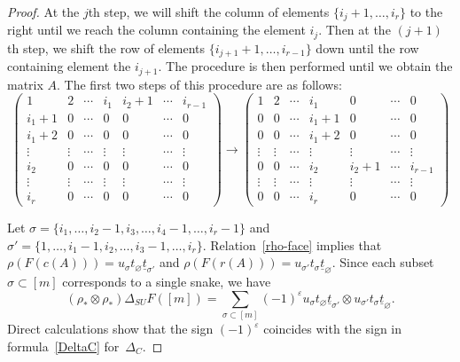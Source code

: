 \documentclass[a4paper,12pt]{amsart}
\theoremstyle{definition}
\theoremstyle{remark}
\numberwithin{equation}{section}
\begin{document}
\begin{proof}
At the $j$th step, we will shift the column of elements $\{i_j + 1, \ldots, i_r \}$ to the right until we reach the column containing the element $i_j$. Then at the $(j+1)$th step, we shift the row of elements $\{i_{j+1} + 1, \ldots, i_{r-1} \}$ down until the row containing element the $i_{j+1}$. The procedure is then performed until we obtain the matrix $A$. The first two steps of this procedure are as follows:
$$\begin{pmatrix}
1 & 2 & \cdots & i_1 & i_2 + 1 & \cdots & i_{r-1} \\
i_1 + 1 & 0 & \cdots & 0 & 0 & \cdots & 0 \\
i_1 + 2 & 0 & \cdots & 0 & 0 & \cdots & 0 \\
\vdots & \vdots & \cdots & \vdots & \vdots & \cdots & \vdots\\
i_2 & 0 & \cdots & 0 & 0 & \cdots & 0 \\
\vdots & \vdots & \cdots & \vdots & \vdots & \cdots & \vdots \\
i_{r} & 0 & \cdots & 0 & 0 & \cdots & 0 
\end{pmatrix} \to
\begin{pmatrix}
1 & 2 & \cdots & i_1 & 0 & \cdots & 0 \\
0 & 0 & \cdots & i_1 + 1 & 0 & \cdots & 0 \\
0 & 0 & \cdots & i_1 + 2 & 0 & \cdots & 0 \\
\vdots & \vdots & \cdots & \vdots & \vdots & \cdots & \vdots\\
0 & 0 & \cdots & i_2 & i_2 + 1 & \cdots & i_{r-1} \\
\vdots & \vdots & \cdots & \vdots & \vdots & \cdots & \vdots \\
0 & 0 & \cdots & i_{r} & 0 & \cdots & 0 
\end{pmatrix}$$

Let $\sigma = \{i_1, \ldots, i_2 - 1, i_3, \ldots, i_4 - 1, \ldots, i_{r} - 1\}$ and $\sigma' = \{1, \ldots, i_1-1, i_2, \ldots, i_3-1, \ldots, i_{r} \}$. Relation~\eqref{rho-face} implies that $\rho(F(c(A))) = u_{\sigma} t_\varnothing \underline{t}_{\sigma'}$ and
$\rho(F(r(A))) = u_{\sigma'} t_{\sigma} \underline{t}_\varnothing$.
Since each subset $\sigma \subset [m]$ corresponds to a single snake, we have
\[
  (\rho_* \otimes \rho_*)\Delta_{SU}F([m]) = \sum_{\sigma \subset [m]} 
  (-1)^\varepsilon u_\sigma t_\varnothing \underline{t}_{\sigma'} \otimes 
  u_{\sigma'}t_{\sigma} \underline{t}_\varnothing.
\]
Direct calculations show that the sign $(-1)^\varepsilon$ coincides with the sign in formula~\eqref{DeltaC} for~$\Delta_{C}$.
\end{proof}
\end{document}
